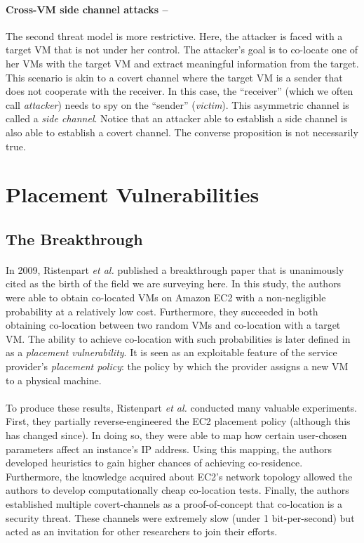 \documentclass[orivec,envcountsame, a4paper, 11pt]{llncs}
\begin{document}
\paragraph{Cross-VM side channel attacks --} The second threat model is more restrictive. Here, the attacker is faced with a target VM that is not under her control. The attacker's goal is to co-locate one of her VMs with the target VM and extract meaningful information from the target. This scenario is akin to a covert channel where the target VM is a sender that does not cooperate with the receiver. In this case, the ``receiver'' (which we often call \textit{attacker}) needs to spy on the ``sender'' (\textit{victim}). This asymmetric channel is called a \textit{side channel}. Notice that an attacker able to establish a side channel is also able to establish a covert channel. The converse proposition is not necessarily true.


\section{Placement Vulnerabilities}
\label{sec:placement}


\subsection{The Breakthrough}
\paragraph{} In 2009, Ristenpart \textit{et al.} published a breakthrough paper \cite{Ristenpart2009} that is unanimously cited as the birth of the field we are surveying here. In this study, the authors were able to obtain co-located VMs on Amazon EC2 with a non-negligible probability at a relatively low cost. Furthermore, they succeeded in both obtaining co-location between two random VMs and co-location with a target VM. The ability to achieve co-location with such probabilities is later defined in \cite{Varadarajan2015} as a \textit{placement vulnerability}. It is seen as an exploitable feature of the service provider's \textit{placement policy}: the policy by which the provider assigns a new VM to a physical machine.

\paragraph{} To produce these results, Ristenpart \textit{et al.} conducted many valuable experiments. First, they partially reverse-engineered the EC2 placement policy (although this has changed since). In doing so, they were able to map how certain user-chosen parameters affect an instance's IP address. Using this mapping, the authors developed heuristics to gain higher chances of achieving co-residence. Furthermore, the knowledge acquired about EC2's network topology allowed the authors to develop computationally cheap co-location tests. Finally, the authors established multiple covert-channels as a proof-of-concept that co-location is a security threat. These channels were extremely slow (under 1 bit-per-second) but acted as an invitation for other researchers to join their efforts.
\end{document}
